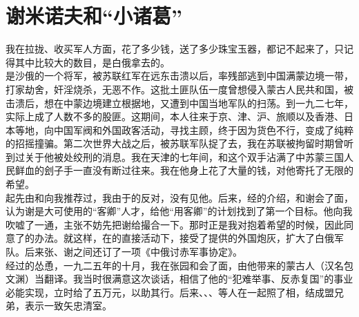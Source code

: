 \fancyhead[RO]{} %
\fancyhead[LE]{} %
\chapter*{谢米诺夫和“小诸葛”}
\thispagestyle{empty}
我在拉拢、收买军人方面，花了多少钱，送了多少珠宝玉器，都记不起来了，只记得其中比较大的数目，是白俄拿去的。\\

是沙俄的一个将军，被苏联红军在远东击溃以后，率残部逃到中国满蒙边境一带，打家劫舍，奸淫烧杀，无恶不作。这批土匪队伍一度曾想侵入蒙古人民共和国，被击溃后，想在中蒙边境建立根据地，又遭到中国当地军队的扫荡。到一九二七年，实际上成了人数不多的股匪。这期间，本人往来于京、津、沪、旅顺以及香港、日本等地，向中国军阀和外国政客活动，寻找主顾，终于因为货色不行，变成了纯粹的招摇撞骗。第二次世界大战之后，被苏联军队捉了去，我在苏联被拘留时期曾听到过关于他被处绞刑的消息。我在天津的七年间，和这个双手沾满了中苏蒙三国人民鲜血的刽子手一直没有断过往来。我在他身上花了大量的钱，对他寄托了无限的希望。\\

起先由和向我推荐过，我由于的反对，没有见他。后来，经的介绍，和谢会了面，认为谢是大可使用的“客卿”人才，给他“用客卿”的计划找到了第一个目标。他向我吹嘘了一通，主张不妨先把谢给撮合一下。那时正是我对抱着希望的时候，因此同意了的办法。就这样，在的直接活动下，接受了提供的外国炮灰，扩大了白俄军队。后来张、谢之间还订了一项《中俄讨赤军事协定》。\\

经过的怂恿，一九二五年的十月，我在张园和会了面，由他带来的蒙古人（汉名包文渊）当翻译。我当时很满意这次谈话，相信了他的“犯难举事、反赤复国”的事业必能实现，立时给了五万元，以助其行。后来、、、等人在一起照了相，结成盟兄弟，表示一致矢忠清室。\\

